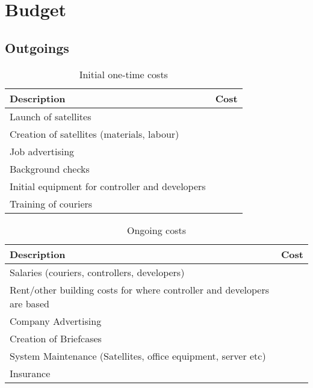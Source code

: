 \section{Budget}

\subsection{Outgoings}

\begin{table}[H]
    \centering
    \begin{tabular}{|p{}|p{}|}
        \hline
        
        \textbf{Description} & \textbf{Cost} \\
        \hline
        Launch of satellites & \\
        \hline
        Creation of satellites (materials, labour) & \\
        \hline
        Job advertising & \\
        \hline
        Background checks & \\
        \hline
        Initial equipment for controller and developers & \\
        \hline
        Training of couriers & \\
        \hline
    \end{tabular}
    \caption{Initial one-time costs}
    \label{tab:initialCosts}
\end{table}

\begin{table}[H]
    \centering
    \begin{tabular}{|p{}|p{}|}
        \hline
        \textbf{Description} & \textbf{Cost} \\
        \hline
        Salaries (couriers, controllers, developers) & \\
        \hline
        Rent/other building costs for where controller and developers are based & \\
        \hline
        Company Advertising & \\
        \hline
        Creation of Briefcases & \\
        \hline
        System Maintenance (Satellites, office equipment, server etc) & \\
        \hline
        Insurance & \\
        \hline
    \end{tabular}
    \caption{Ongoing costs}
    \label{tab:ongoingCosts}
\end{table}

